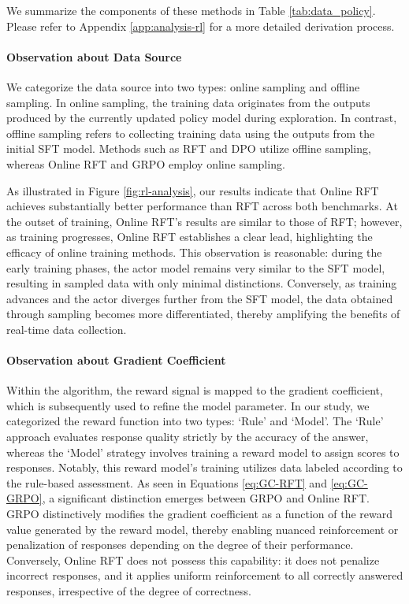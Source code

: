 \begin{itemize}[topsep=0pt]
\begin{itemize}[topsep=0pt]
We summarize the components of these methods in Table \ref{tab:data_policy}.
Please refer to Appendix \ref{app:analysis-rl} for a more detailed derivation process.

\paragraph{Observation about Data Source} We categorize the data source into two types: online sampling and offline sampling. In online sampling, the training data originates from the outputs produced by the currently updated policy model during exploration. In contrast, offline sampling refers to collecting training data using the outputs from the initial SFT model. Methods such as RFT and DPO utilize offline sampling, whereas Online RFT and GRPO employ online sampling.

As illustrated in Figure \ref{fig:rl-analysis}, our results indicate that Online RFT achieves substantially better performance than RFT across both benchmarks. At the outset of training, Online RFT's results are similar to those of RFT; however, as training progresses, Online RFT establishes a clear lead, highlighting the efficacy of online training methods. This observation is reasonable: during the early training phases, the actor model remains very similar to the SFT model, resulting in sampled data with only minimal distinctions. Conversely, as training advances and the actor diverges further from the SFT model, the data obtained through sampling becomes more differentiated, thereby amplifying the benefits of real-time data collection.

\paragraph{Observation about Gradient Coefficient} Within the algorithm, the reward signal is mapped to the gradient coefficient, which is subsequently used to refine the model parameter. In our study, we categorized the reward function into two types: `Rule' and `Model'. The `Rule' approach evaluates response quality strictly by the accuracy of the answer, whereas the `Model' strategy involves training a reward model to assign scores to responses. Notably, this reward model's training utilizes data labeled according to the rule-based assessment. As seen in Equations \ref{eq:GC-RFT} and \ref{eq:GC-GRPO}, a significant distinction emerges between GRPO and Online RFT. GRPO distinctively modifies the gradient coefficient as a function of the reward value generated by the reward model, thereby enabling nuanced reinforcement or penalization of responses depending on the degree of their performance. Conversely, Online RFT does not possess this capability: it does not penalize incorrect responses, and it applies uniform reinforcement to all correctly answered responses, irrespective of the degree of correctness.


\end{itemize}
\end{itemize}
